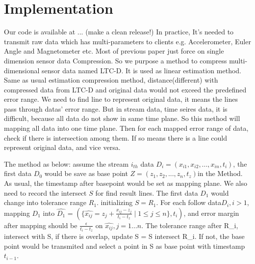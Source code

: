 \documentclass[10pt, conference, compsocconf]{IEEEtran}
\begin{document}
\section{Implementation}
Our code is available at ... (make a clean release!)
In practice, It's needed to transmit raw data which has multi-parameters
to clients e.g. Accelerometer, Euler Angle and Magnetometer etc.
Most of previous paper just force on single dimension sensor
data Compression. So we purpose a method to compress multi-dimensional
sensor data named LTC-D. It is used as linear estimation method.
Same as usual estimation compression method,  distance(different)
with compressed data from LTC-D and original data would not exceed
the predefined error range. We need to find line to represent
original data, it means the lines pass through datas' error range.
But in stream data, time seires data, it is difficult, because
all data do not show in same time plane. So this method will
mapping all data into one time plane. Then for each mapped error
range of data, check if there is intersection among them. If so means
there is a line could represent original data, and vice versa.

The method as below: assume the stream $i_{th}$ data
$D_i = (x_{i1}, x_{i2}, ..., x_{in},t_i)$, the first data $D_0$ would
be save as base point $Z=(z_{1}, z_{2}, ..., z_{n},t_z)$in the Method.
As usual, the timestamp after basepoint would be set as mapping plane.
We also need to record the intersect $S$ for find result lines.
The first data $D_1$ would change into tolerance range $R_1$.
initializing $S = R_1$. For each follow data$ D_i, i>1$, mapping $D_1$
into $\hat{D_1}$ = $(\{\hat{x_{ij}}=z_j + \frac{x_{ij}-z_{j}}{t_i-t_z} \mid1\leqslant{j}\leqslant{n}\},t_i)$,
and error margin after mapping should be $\frac{\epsilon}{t_i-t_z}$
on $\hat{x_{ij}}, j={1...n}$. The tolerance range after R_i, intersect
with S, if there is overlap, update S = S intersect R_i. If not, the base point
would be transmited and select a point in S as base point with timestamp $t_{i-1}$.
\end{document}
